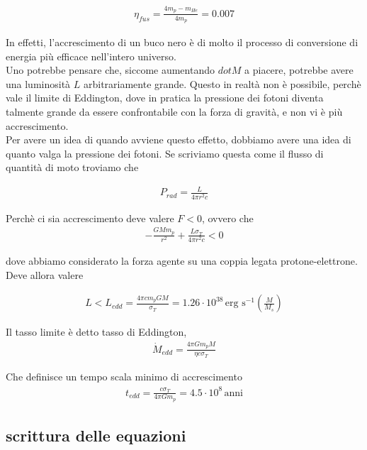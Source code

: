 \documentclass{report}
\begin{document}
\begin{align}
    \eta_{fus} = \frac{4m_p - m_{He}}{4m_p} = 0.007
\end{align}

In effetti, l'accrescimento di un buco nero è di molto il processo di conversione di energia più efficace nell'intero universo. \\

Uno potrebbe pensare che, siccome aumentando \(dot{M}\) a piacere, potrebbe avere una luminosità \(L\) arbitrariamente grande. Questo in realtà non è possibile, perchè vale il limite di Eddington, dove in pratica la pressione dei fotoni diventa talmente grande da essere confrontabile con la forza di gravità, e non vi è più accrescimento. \\

Per avere un idea di quando avviene questo effetto, dobbiamo avere una idea di quanto valga la pressione dei fotoni. Se scriviamo questa come il flusso di quantità di moto troviamo che 

\begin{align}
    P_{rad} = \frac{L}{4\pi r^2 c}
\end{align}

Perchè ci sia accrescimento deve valere \(F<0\), ovvero che 
\begin{align}
    -\frac{GM m_p}{r^2} + \frac{L \sigma_T}{4\pi r^2 c} < 0
\end{align}

dove abbiamo considerato la forza agente su una coppia legata protone-elettrone. \\

Deve allora valere 

\begin{align}
    L < L_{edd} = \frac{4\pi c m_p GM}{\sigma_T} = 1.26 \cdot 10^{38} \, \text{erg s}^{-1} \left(\frac{M}{M_s}\right)
\end{align}

Il tasso limite è detto tasso di Eddington, 
\begin{align}
    \dot{M}_{edd} = \frac{4\pi G m_p M}{\eta c \sigma_T}
\end{align}

Che definisce un tempo scala minimo di accrescimento 
\begin{align}
    t_{edd} = \frac{c\sigma_T}{4\pi G m_p} = 4.5 \cdot 10^{8}   \, \text{anni}
\end{align}

\subsection{scrittura delle equazioni}
\end{document}
